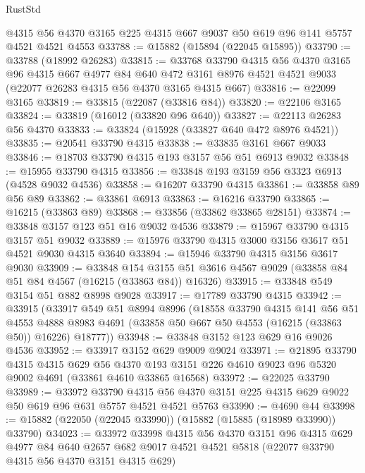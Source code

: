 \begin{lexlean}{RustStd}
\begin{coremodule}
    @4315
    @56
    @4370
    @3165
    @225
    @4315
    @667
    @9037
    @50
    @619
    @96
    @141
    @5757
    @4521
    @4521
    @4553
@33788 := @15882 (@15894 (@22045 @15895))
@33790 := @33788 (@18992 @26283)
@33815 := @33768
    @33790
    @4315
    @56
    @4370
    @3165
    @96
    @4315
    @667
    @4977
    @84
    @640
    @472
    @3161
    @8976
    @4521
    @4521
    @9033
    (@22077 @26283 @4315 @56 @4370 @3165 @4315 @667)
@33816 := @22099 @3165
@33819 := @33815 (@22087 (@33816 @84))
@33820 := @22106 @3165
@33824 := @33819 (@16012 (@33820 @96 @640))
@33827 := @22113 @26283 @56 @4370
@33833 := @33824 (@15928 (@33827 @640 @472 @8976 @4521))
@33835 := @20541 @33790 @4315
@33838 := @33835 @3161 @667 @9033
@33846 := @18703 @33790 @4315 @193 @3157 @56 @51 @6913 @9032
@33848 := @15955 @33790 @4315
@33856 := @33848 @193 @3159 @56 @3323 @6913 (@4528 @9032 @4536)
@33858 := @16207 @33790 @4315
@33861 := @33858 @89 @56 @89
@33862 := @33861 @6913
@33863 := @16216 @33790
@33865 := @16215 (@33863 @89)
@33868 := @33856 (@33862 @33865 @28151)
@33874 := @33848 @3157 @123 @51 @16 @9032 @4536
@33879 := @15967 @33790 @4315 @3157 @51 @9032
@33889 := @15976 @33790 @4315 @3000 @3156 @3617 @51 @4521 @9030 @4315 @3640
@33894 := @15946 @33790 @4315 @3156 @3617 @9030
@33909 := @33848
    @154
    @3155
    @51
    @3616
    @4567
    @9029
    (@33858 @84 @51 @84 @4567 (@16215 (@33863 @84)) @16326)
@33915 := @33848 @549 @3154 @51 @882 @8998 @9028
@33917 := @17789 @33790 @4315
@33942 := @33915
    (@33917
      @549
      @51
      @8994
      @8996
      (@18558
        @33790
        @4315
        @141
        @56
        @51
        @4553
        @4888
        @8983
        @4691
        (@33858 @50 @667 @50 @4553 (@16215 (@33863 @50)) @16226)
        @18777))
@33948 := @33848 @3152 @123 @629 @16 @9026 @4536
@33952 := @33917 @3152 @629 @9009 @9024
@33971 := @21895
    @33790
    @4315
    @4315
    @629
    @56
    @4370
    @193
    @3151
    @226
    @4610
    @9023
    @96
    @5320
    @9002
    @4691
    (@33861 @4610 @33865 @16568)
@33972 := @22025 @33790
@33989 := @33972
    @33790
    @4315
    @56
    @4370
    @3151
    @225
    @4315
    @629
    @9022
    @50
    @619
    @96
    @631
    @5757
    @4521
    @4521
    @5763
@33990 := @4690 @44
@33998 := @15882 (@22050 (@22045 @33990)) (@15882 (@15885 (@18989 @33990)) @33790)
@34023 := @33972
    @33998
    @4315
    @56
    @4370
    @3151
    @96
    @4315
    @629
    @4977
    @84
    @640
    @2657
    @682
    @9017
    @4521
    @4521
    @5818
    (@22077 @33790 @4315 @56 @4370 @3151 @4315 @629)

\end{coremodule}
\end{lexlean}
